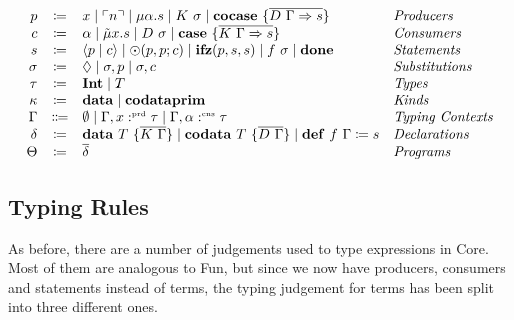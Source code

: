 \begin{definition}
    \[
      \begin{array}{rcll}
        p & \coloneqq & x \mid \lit{n} \mid \mu\alpha.s \mid K\ \sigma \mid \cocase{\overline{D\ \Gamma \Rightarrow s}} & \emph{Producers}\\
        c & \coloneqq & \alpha \mid \tilde{\mu}x.s \mid D\ \sigma \mid \case{\overline{K\ \Gamma \Rightarrow s}}& \emph{Consumers}\\
        s & \coloneqq & \cut{p}{c} \mid \odot(p, p; c) \mid \ifz{p}{s}{s} \mid f\ \sigma\mid \done & \emph{Statements}\\
        \sigma & \coloneqq & \nil \mid \sigma, p \mid \sigma, c & \emph{Substitutions}\\
        \tau & \coloneqq & \tyint \mid T & \emph{Types}\\
        \kappa & \coloneqq & \mathbf{data}\mid\mathbf{codata}\mathbf{prim} & \emph{Kinds}\\
        \Gamma & \Coloneqq & \emptyset \mid \Gamma, x \prd \tau \mid \Gamma, \alpha \cnt \tau & \emph{Typing Contexts} \\
        \delta & \coloneqq & \mathbf{data}\ T\ \{ \overline{K\ \Gamma} \} \mid \mathbf{codata}\ T\ \{ \overline{D\ \Gamma }\} \mid \defi{f\ \Gamma}{s} & \emph{Declarations}\\
       \Theta & \coloneqq & \overline{\delta} & \emph{Programs}\\
     \end{array}
    \]
  \end{definition}

\subsection{Typing Rules}
\label{subsec:core:typing-rules}

As before, there are a number of judgements used to type expressions in Core. 
Most of them are analogous to Fun, but since we now have producers, consumers and statements instead of terms, the typing judgement for terms has been split into three different ones. 

